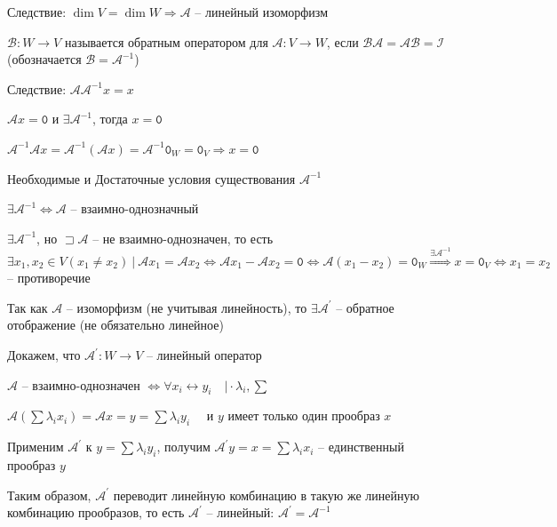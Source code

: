 \documentclass[12pt]{article}
\begin{document}
    Следствие: $\dim V = \dim W \Longrightarrow \mathcal{A}$ -- линейный изоморфизм

    \hypertarget{reverselinearoperator}{}

    \Def $\mathcal{B} : W \rightarrow V$ называется обратным оператором для $\mathcal{A} : V \rightarrow W$,
    если $\mathcal{B}\mathcal{A} = \mathcal{A}\mathcal{B} = \mathcal{I}$ (обозначается $\mathcal{B} = \mathcal{A}^{-1}$)

    Следствие: $\mathcal{A}\mathcal{A}^{-1} x = x$

    \begin{MyTheorem}
        \Ths $\mathcal{A}x = \texttt{0}$ и $\exists \mathcal{A}^{-1}$, тогда $x = \texttt{0}$
    \end{MyTheorem}

    \begin{MyProof}
        $\mathcal{A}^{-1}\mathcal{A} x = \mathcal{A}^{-1}(\mathcal{A} x) = \mathcal{A}^{-1} \texttt{0}_W = \texttt{0}_V \Longrightarrow x = \texttt{0}$
    \end{MyProof}

    \begin{MyTheorem}
        \Ths Необходимые и Достаточные условия существования $\mathcal{A}^{-1}$

        $\exists \mathcal{A}^{-1} \Longleftrightarrow \mathcal{A}$ -- взаимно-однозначный
    \end{MyTheorem}

    \begin{MyProof}
        \fbox{$\Longrightarrow$} $\exists \mathcal{A}^{-1}$, но $\sqsupset \mathcal{A}$ -- не взаимно-однозначен, то есть
        $\exists x_1, x_2 \in V (x_1 \neq x_2) \ | \ \mathcal{A}x_1 = \mathcal{A}x_2 \Longleftrightarrow \mathcal{A}x_1 - \mathcal{A}x_2 = \texttt{0} \Longleftrightarrow
        \mathcal{A}(x_1 - x_2) = \texttt{0}_W \stackrel{\exists \mathcal{A}^{-1}}{\Longrightarrow} x = \texttt{0}_V \Longleftrightarrow x_1 = x_2$ -- противоречие


        \fbox{$\Longleftarrow$} Так как $\mathcal{A}$ -- изоморфизм (не учитывая линейность), 
        то $\exists \mathcal{A}^\prime$ -- обратное отображение (не обязательно линейное)

        Докажем, что $\mathcal{A}^\prime : W \rightarrow V$ -- линейный оператор

        $\mathcal{A}$ -- взаимно-однозначен $\Longleftrightarrow \forall x_i \longleftrightarrow y_i \quad \Big| \cdot \lambda_i, \sum$

        $\mathcal{A}\left(\sum \lambda_i x_i\right) = \mathcal{A} x = y = \sum \lambda_i y_i \quad$ и $y$ имеет только один прообраз $x$

        Применим $\mathcal{A}^\prime$ к $y = \sum \lambda_i y_i$, получим $\mathcal{A}^\prime y = x = \sum \lambda_i x_i$ -- единственный прообраз $y$

        Таким образом, $\mathcal{A}^\prime$ переводит линейную комбинацию в такую же линейную комбинацию прообразов, то есть $\mathcal{A}^\prime$ -- линейный: $\mathcal{A}^\prime = \mathcal{A}^{-1}$
    \end{MyProof}
\end{document}
